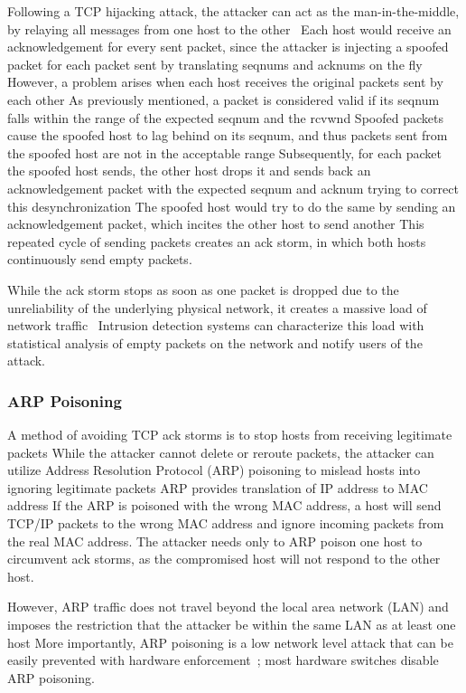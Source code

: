 \documentclass{sig-alternate}
\begin{document}
Following a TCP hijacking attack, the attacker can act as the man-in-the-middle, by relaying all messages from one host to the other~\cite{joncheray:simpleattack, gregg:stackhack}
Each host would receive an acknowledgement for every sent packet, since the attacker is injecting a spoofed packet for each packet sent by translating seqnums and acknums on the fly
However, a problem arises when each host receives the original packets sent by each other
As previously mentioned, a packet is considered valid if its seqnum falls within the range of the expected seqnum and the rcvwnd
Spoofed packets cause the spoofed host to lag behind on its seqnum, and thus packets sent from the spoofed host are not in the acceptable range
Subsequently, for each packet the spoofed host sends, the other host drops it and sends back an acknowledgement packet with the expected seqnum and acknum trying to correct this desynchronization
The spoofed host would try to do the same by sending an acknowledgement packet, which incites the other host to send another
This repeated cycle of sending packets creates an ack storm, in which both hosts continuously send empty packets.

While the ack storm stops as soon as one packet is dropped due to the unreliability of the underlying physical network, it creates a massive load of network traffic~\cite{joncheray:simpleattack}
Intrusion detection systems can characterize this load with statistical analysis of empty packets on the network and notify users of the attack.

\subsubsection{ARP Poisoning}

A method of avoiding TCP ack storms is to stop hosts from receiving legitimate packets
While the attacker cannot delete or reroute packets, the attacker can utilize Address Resolution Protocol (ARP) poisoning to mislead hosts into ignoring legitimate packets
ARP provides translation of IP address to MAC address
If the ARP is poisoned with the wrong MAC address, a host will send TCP/IP packets to the wrong MAC address and ignore incoming packets from the real MAC address.
The attacker needs only to ARP poison one host to circumvent ack storms, as the compromised host will not respond to the other host.

However, ARP traffic does not travel beyond the local area network (LAN) and imposes the restriction that the attacker be within the same LAN as at least one host
More importantly, ARP poisoning is a low network level attack that can be easily prevented with hardware enforcement~\cite{spangler:sniffing}; most hardware switches disable ARP poisoning.
\end{document}
